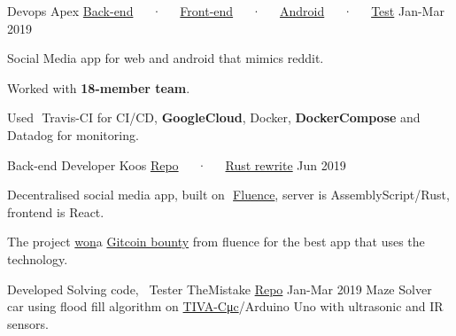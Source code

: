

\begin{cventries}

  \cventry
    {Devops} %
    {Apex \tiny{\href{https://www.github.com/DarkGeekMS/ApeX-Server}{Back-end}~~~·~~~\href{http://www.github.com/DarkGeekMS/ApeX-Web}{Front-end}~~~·~~~\href{http://www.github.com/DarkGeekMS/ApeX-Mobile}{Android}~~~·~~~\href{https://www.github.com/DarkGeekMS/apeXTesting}{Test}}} %
    {} %
    {Jan-Mar 2019} %
    {
      \begin{cvitems} %
        \item {Social Media app for web and android that mimics reddit.}
        \item {Worked with \textbf{18-member team}.}
        \item {Used ​ Travis-CI ​for CI/CD, \textbf{​GoogleCloud​}, Docker, \textbf{​DockerCompose​} and Datadog for monitoring.}
      \end{cvitems}
    }

  \cventry
    {Back-end Developer} %
    {Koos \tiny{\href{https://gitlab.com/koos-project/koos}{Repo}~~~·~~~\href{https://gitlab.com/koos-project/koos/tree/rust-migration/server}{Rust rewrite}}} %
    {} %
    {Jun 2019} %
    {
      \begin{cvitems} %
        \item {Decentralised social media app, built on ​ \href{http://fluence.dev/}{Fluence​}, server is AssemblyScript/Rust, frontend is React.}
        \item {The project \href{https://www.linkedin.com/feed/update/urn:li:activity:6575339127934341120/}{​won​} a ​\href{https://gitcoin.co/issue/fluencelabs/Bounties/1/3290}{Gitcoin bounty​} from fluence for the best app that uses the technology.}
      \end{cvitems}
    }

  \cventry
    {Developed Solving code, ~Tester} %
    {TheMistake \tiny{\href{https://www.github.com/Abdulrahman-Khalid/mazeSolver}{Repo}}} %
    {} %
    {Jan-Mar 2019} %
    {
      {Maze Solver ​ car using flood fill algorithm on \href{http://www.ti.com/tool/EK-TM4C123GXL}{​TIVA-C ​μc}​/Arduino Uno with ultrasonic and IR sensors.}
    }


\end{cventries}
